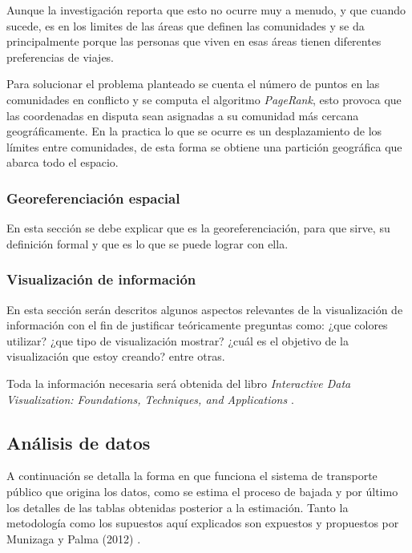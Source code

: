 \documentclass[12pt]{article}
\begin{document}
Aunque la investigación reporta que esto no ocurre muy a menudo, y que cuando sucede, es en los limites de las áreas que definen las comunidades y se da principalmente porque las personas que viven en esas áreas tienen diferentes preferencias de viajes.

Para solucionar el problema planteado se cuenta el número de puntos en las comunidades en conflicto y se computa el algoritmo \textit{PageRank}, esto provoca que las coordenadas en disputa sean asignadas a su comunidad más cercana geográficamente. En la practica lo que se ocurre es un desplazamiento de los límites entre comunidades, de esta forma se obtiene una partición geográfica que abarca todo el espacio.
    
	\subsubsection{Georeferenciación espacial}

En esta sección se debe explicar que es la georeferenciación, para que sirve, su definición formal y que es lo que se puede lograr con ella.
    
	\subsubsection{Visualización de información}    
	En esta sección serán descritos algunos aspectos relevantes de la visualización de información con el fin de justificar teóricamente preguntas como: ¿que colores utilizar? ¿que tipo de visualización mostrar? ¿cuál es el objetivo de la visualización que estoy creando? entre otras. 
	
	Toda la información necesaria será obtenida del libro \textit{Interactive Data Visualization: Foundations, Techniques, and Applications} \cite{libro_visualizacion}.
    
    \subsection{Análisis de datos}\label{sec:Analisis_datos}

	A continuación se detalla la forma en que funciona el sistema de transporte público que origina los datos, como se estima el proceso de bajada y por último los detalles de las tablas obtenidas posterior a la estimación. Tanto la metodología como los supuestos aquí explicados son expuestos y propuestos por Munizaga y Palma (2012) \cite{Procesamiento_datos}.
	
\end{document}
